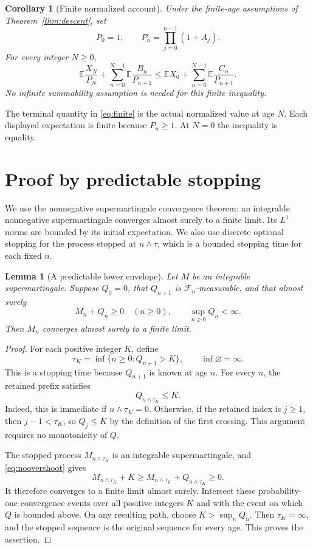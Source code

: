 \documentclass[11pt]{article}
\newtheorem{lemma}[theorem]{Lemma}
\newtheorem{corollary}[theorem]{Corollary}
\newcommand{\E}{\mathbb E}
\newcommand{\F}{\mathcal F}
\begin{document}
\begin{corollary}[Finite normalized account]\label{cor:finite}
Under the finite-age assumptions of Theorem~\ref{thm:descent}, set
\[
 P_0=1,\qquad P_n=\prod_{j=0}^{n-1}(1+A_j).
\]
For every integer $N\ge0$,
\begin{equation}\label{eq:finite}
 \E\frac{X_N}{P_N}
 +\sum_{n=0}^{N-1}\E\frac{B_n}{P_{n+1}}
 \le \E X_0+\sum_{n=0}^{N-1}\E\frac{C_n}{P_{n+1}}.
\end{equation}
No infinite summability assumption is needed for this finite inequality.
\end{corollary}
The terminal quantity in \eqref{eq:finite} is the actual normalized value at
age $N$. Each displayed expectation is finite because $P_n\ge1$. At $N=0$
the inequality is equality.

\section{Proof by predictable stopping}\label{sec:proof}
We use the nonnegative supermartingale convergence theorem: an integrable
nonnegative supermartingale converges almost surely to a finite limit. Its
$L^1$ norms are bounded by its initial expectation. We also use discrete
optional stopping for the process stopped at $n\wedge\tau$, which is a
bounded stopping time for each fixed $n$.

\begin{lemma}[A predictable lower envelope]\label{lem:localization}
Let $M$ be an integrable supermartingale. Suppose $Q_0=0$, that $Q_{n+1}$ is
$\F_n$-measurable, and that almost surely
\[
 M_n+Q_n\ge0\quad(n\ge0),\qquad \sup_{n\ge0}Q_n<\infty.
\]
Then $M_n$ converges almost surely to a finite limit.
\end{lemma}
\begin{proof}
For each positive integer $K$, define
\[
 \tau_K=\inf\{n\ge0:Q_{n+1}>K\},\qquad \inf\varnothing=\infty.
\]
This is a stopping time because $Q_{n+1}$ is known at age $n$.
For every $n$, the retained prefix satisfies
\begin{equation}\label{eq:noovershoot}
 Q_{n\wedge\tau_K}\le K.
\end{equation}
Indeed, this is immediate if $n\wedge\tau_K=0$. Otherwise, if the retained
index is $j\ge1$, then $j-1<\tau_K$, so $Q_j\le K$ by the definition of the
first crossing. This argument requires no monotonicity of $Q$.

The stopped process $M_{n\wedge\tau_K}$ is an integrable supermartingale,
and \eqref{eq:noovershoot} gives
\[
 M_{n\wedge\tau_K}+K\ge M_{n\wedge\tau_K}+Q_{n\wedge\tau_K}\ge0.
\]
It therefore converges to a finite limit almost surely. Intersect these
probability-one convergence events over all positive integers $K$ and with
the event on which $Q$ is bounded above. On any resulting path, choose
$K>\sup_n Q_n$. Then $\tau_K=\infty$, and the stopped sequence is the
original sequence for every age. This proves the assertion.
\end{proof}
\end{document}
